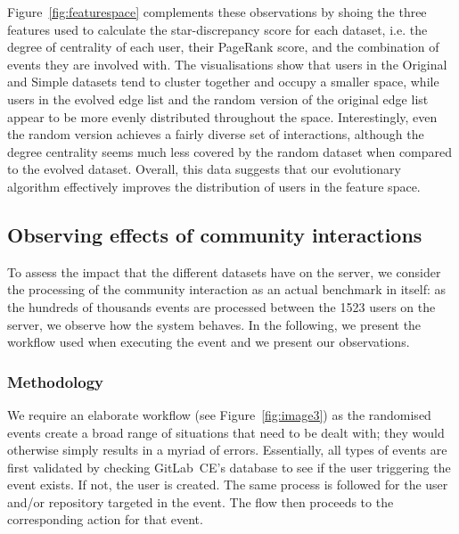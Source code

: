 \documentclass[dvipsnames,format=sigconf,anonymous=False,review=false, balance=false]{acmart}
\begin{document}
Figure~\ref{fig:featurespace} complements these observations by shoing the three features used to calculate the star-discrepancy score for each dataset, i.e. the degree of centrality of each user, their PageRank score, and the combination of events they are involved with. The visualisations show that users in the Original and Simple datasets tend to cluster together and occupy a smaller space, while users in the evolved edge list and the random version of the original edge list appear to be more evenly distributed throughout the space. Interestingly, even the random version achieves a fairly diverse set of interactions, although the degree centrality seems much less covered by the random dataset when compared to the evolved dataset. Overall, this data suggests that our evolutionary algorithm effectively improves the distribution of users in the feature space.

\subsection{Observing effects of community interactions}

To assess the impact that the different datasets have on the server, we consider the processing of the community interaction as an actual benchmark in itself: as the hundreds of thousands events are processed between the 1523 users on the server, we observe how the system behaves. 
In the following, we present the workflow used when executing the event and we present our observations.

\subsubsection{Methodology}

We require an elaborate workflow (see Figure~\ref{fig:image3}) as the randomised events create a broad range of situations that need to be dealt with; they would otherwise simply results in a myriad of errors. Essentially, all types of events are first validated by checking GitLab~CE's database to see if the user triggering the event exists. If not, the user is created. The same process is followed for the user and/or repository targeted in the event. The flow then proceeds to the corresponding action for that event.
\end{document}
